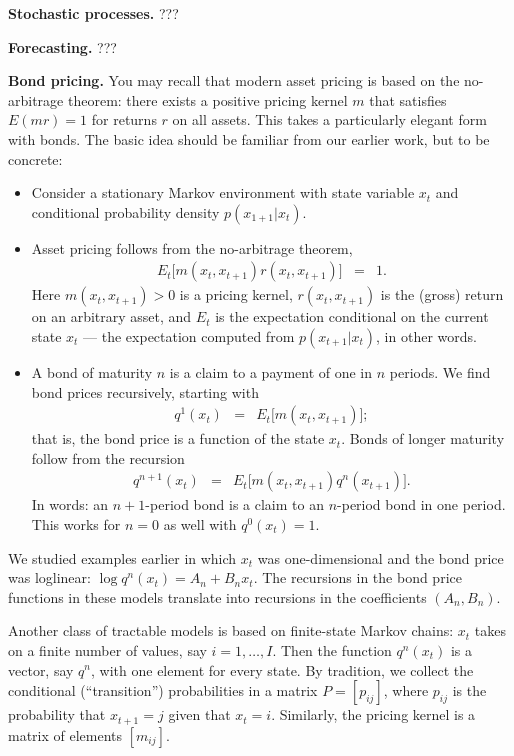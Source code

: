 \documentclass[11pt]{article}
\begin{document}
{\bf Stochastic processes.\/}
???

{\bf Forecasting.\/}
???


{\bf Bond pricing.\/}
You may recall that modern asset pricing is based on the no-arbitrage theorem:
there exists a positive pricing kernel $m$ that satisfies
$ E(mr) = 1$ for returns $r$ on all assets.
This takes a particularly elegant form with bonds.
The basic idea should be familiar from our earlier work,
but to be concrete:
%
\begin{itemize}
\item Consider a stationary Markov environment
with state variable $x_t$ and conditional probability density
$ p(x_{1+1} | x_t) $.
\item Asset pricing follows from the no-arbitrage theorem,
\begin{eqnarray*}
    E_t \big[ m(x_t,x_{t+1}) r(x_t,x_{t+1}) \big] &=& 1.
\end{eqnarray*}
Here $ m(x_t,x_{t+1})>0$ is a pricing kernel,
$r(x_t,x_{t+1})$ is the (gross) return on an arbitrary asset,
and $E_t$ is the expectation conditional on the current state $x_t$
--- the expectation computed from $p(x_{t+1} | x_t)$, in other words.

\item A bond of maturity $n$ is a claim to a payment of one in $n$ periods.
We find bond prices recursively, starting with
\begin{eqnarray*}
    q^1(x_t) &=& E_t \big[ m(x_t,x_{t+1}) \big] ;
\end{eqnarray*}
that is, the bond price is a function of the state $x_t$.
Bonds of longer maturity follow from the recursion
\begin{eqnarray}
    q^{n+1}(x_t) &=& E_t \big[ m(x_t,x_{t+1}) q^n(x_{t+1})\big] .
    \label{eq:recursion-bond}
\end{eqnarray}
In words:  an $n+1$-period bond is a claim to an $n$-period bond in one period.
This works for $n=0$ as well with $ q^0(x_t) = 1$.
\end{itemize}
We studied examples earlier in which $x_t$ was one-dimensional
and the bond price was loglinear:  $ \log q^n(x_t) = A_n + B_n x_t$.
The recursions in the bond price functions in these models translate into recursions
in the coefficients $ (A_n,B_n) $.

Another class of tractable models is based on finite-state Markov chains:
$x_t$ takes on a finite number of values, say $i = 1,\ldots, I$.
Then the function $q^n(x_t)$ is a vector, say $q^n$,
with one element for every state.
By tradition, we collect the conditional (``transition'') probabilities
in a matrix $P = [p_{ij}]$,
where $p_{ij}$ is the probability that $x_{t+1} = j$ given that $x_t = i$.
Similarly, the pricing kernel is a matrix of elements $[m_{ij}]$.
\end{document}
